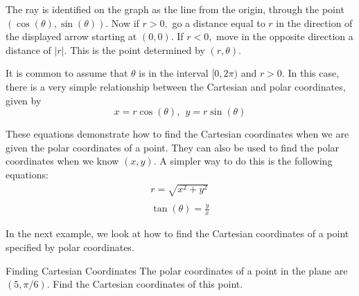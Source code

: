 The ray is identified on the graph as the line from the origin, through the point $(\cos(\theta),\sin(\theta))$. Now if $r>0,$ go a distance
equal to $r$ in the direction of the displayed arrow starting at $(0,0)$. If 
$r<0,$ move in the opposite direction a distance of $\left\vert r\right\vert 
$. This is the point determined by $\left( r,\theta \right)$.

It is common to assume that $\theta $ is in the interval $
[0,2\pi )$ and $r>0.$ In this case, there is a very simple relationship
between the Cartesian and polar coordinates, given by
\begin{equation}
x=r\cos \left( \theta \right) ,\ \ y=r\sin \left( \theta \right) 
\label{cartpolcoord}
\end{equation}

These equations demonstrate how to find the Cartesian coordinates when we are given the polar coordinates of a point. They can also be used to find the polar coordinates when we know $\left( x, y \right)$. A simpler way to do this is the following equations:
\begin{equation}
\begin{array}{l}
r = \sqrt{x^2 + y^2} \\
\\
\tan \left(\theta\right) = \frac{y}{x}
\end{array}
\label{polcartcoord}
\end{equation}

In the next example, we look at how to find the Cartesian coordinates of a point specified by polar coordinates. 

\begin{example}{Finding Cartesian Coordinates}{}
The polar coordinates of a point in the plane are $\left( 5,\pi /6\right) $.
Find the Cartesian coordinates of this point.
\end{example}

